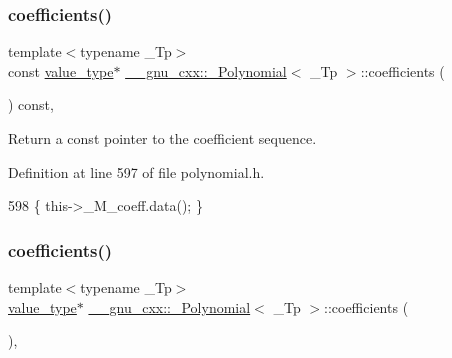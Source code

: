 \subsubsection{\texorpdfstring{coefficients()}{coefficients()}\hspace{0.1cm}{\footnotesize\ttfamily [1/2]}}
{\footnotesize\ttfamily template$<$typename \+\_\+\+Tp$>$ \\
const \hyperlink{class____gnu__cxx_1_1__Polynomial_a725563351f50e76084a7a016c06f8a53}{value\+\_\+type}$\ast$ \hyperlink{class____gnu__cxx_1_1__Polynomial}{\+\_\+\+\_\+gnu\+\_\+cxx\+::\+\_\+\+Polynomial}$<$ \+\_\+\+Tp $>$\+::coefficients (\begin{DoxyParamCaption}{ }\end{DoxyParamCaption}) const\hspace{0.3cm}{\ttfamily [inline]}, {\ttfamily [noexcept]}}

Return a {\ttfamily const} pointer to the coefficient sequence. 

Definition at line 597 of file polynomial.\+h.


\begin{DoxyCode}
598       \{ this->\_M\_coeff.data(); \}
\end{DoxyCode}
\mbox{\label{class____gnu__cxx_1_1__Polynomial_ace23c82d514bb2b7b4e79494bcc47ea7}} 
\subsubsection{\texorpdfstring{coefficients()}{coefficients()}\hspace{0.1cm}{\footnotesize\ttfamily [2/2]}}
{\footnotesize\ttfamily template$<$typename \+\_\+\+Tp$>$ \\
\hyperlink{class____gnu__cxx_1_1__Polynomial_a725563351f50e76084a7a016c06f8a53}{value\+\_\+type}$\ast$ \hyperlink{class____gnu__cxx_1_1__Polynomial}{\+\_\+\+\_\+gnu\+\_\+cxx\+::\+\_\+\+Polynomial}$<$ \+\_\+\+Tp $>$\+::coefficients (\begin{DoxyParamCaption}{ }\end{DoxyParamCaption})\hspace{0.3cm}{\ttfamily [inline]}, {\ttfamily [noexcept]}}

